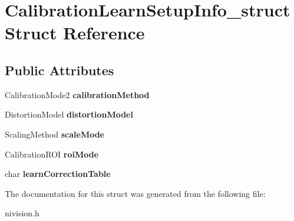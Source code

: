 \hypertarget{structCalibrationLearnSetupInfo__struct}{
\section{CalibrationLearnSetupInfo\_\-struct Struct Reference}
\label{structCalibrationLearnSetupInfo__struct}
}
\subsection*{Public Attributes}
\begin{DoxyCompactItemize}
\item 
\hypertarget{structCalibrationLearnSetupInfo__struct_a6dd6a3e7b2ac7aeb9129a35a317c6629}{
CalibrationMode2 {\bfseries calibrationMethod}}
\label{structCalibrationLearnSetupInfo__struct_a6dd6a3e7b2ac7aeb9129a35a317c6629}

\item 
\hypertarget{structCalibrationLearnSetupInfo__struct_a04812f302ac31b0b662078caed654c32}{
DistortionModel {\bfseries distortionModel}}
\label{structCalibrationLearnSetupInfo__struct_a04812f302ac31b0b662078caed654c32}

\item 
\hypertarget{structCalibrationLearnSetupInfo__struct_a4fddaa97dcdbbf6a49c64ff78a3a0953}{
ScalingMethod {\bfseries scaleMode}}
\label{structCalibrationLearnSetupInfo__struct_a4fddaa97dcdbbf6a49c64ff78a3a0953}

\item 
\hypertarget{structCalibrationLearnSetupInfo__struct_af1bd3bba216f0c02cfef9943f256c60e}{
CalibrationROI {\bfseries roiMode}}
\label{structCalibrationLearnSetupInfo__struct_af1bd3bba216f0c02cfef9943f256c60e}

\item 
\hypertarget{structCalibrationLearnSetupInfo__struct_a81e7cb9ab9b69ad4489a56e95395118d}{
char {\bfseries learnCorrectionTable}}
\label{structCalibrationLearnSetupInfo__struct_a81e7cb9ab9b69ad4489a56e95395118d}

\end{DoxyCompactItemize}


The documentation for this struct was generated from the following file:\begin{DoxyCompactItemize}
\item 
nivision.h\end{DoxyCompactItemize}

